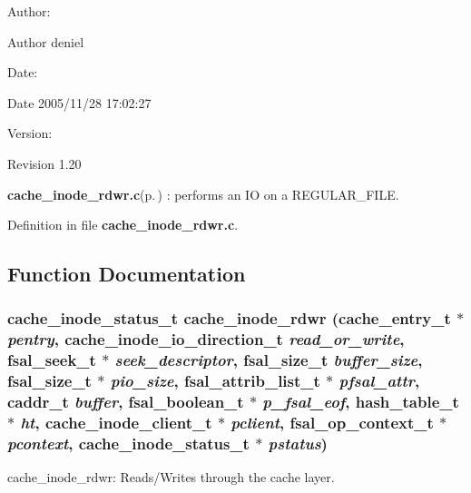 \begin{Desc}
\item[Author:]\begin{Desc}
\item[Author]deniel \end{Desc}
\end{Desc}
\begin{Desc}
\item[Date:]\begin{Desc}
\item[Date]2005/11/28 17:02:27 \end{Desc}
\end{Desc}
\begin{Desc}
\item[Version:]\begin{Desc}
\item[Revision]1.20 \end{Desc}
\end{Desc}
{\bf cache\_\-inode\_\-rdwr.c}{\rm (p.\,\pageref{cache__inode__rdwr_8c})} : performs an IO on a REGULAR\_\-FILE.

Definition in file {\bf cache\_\-inode\_\-rdwr.c}.

\subsection{Function Documentation}
\subsubsection{\setlength{\rightskip}{0pt plus 5cm}cache\_\-inode\_\-status\_\-t cache\_\-inode\_\-rdwr (cache\_\-entry\_\-t $\ast$ {\em pentry}, cache\_\-inode\_\-io\_\-direction\_\-t {\em read\_\-or\_\-write}, fsal\_\-seek\_\-t $\ast$ {\em seek\_\-descriptor}, fsal\_\-size\_\-t {\em buffer\_\-size}, fsal\_\-size\_\-t $\ast$ {\em pio\_\-size}, fsal\_\-attrib\_\-list\_\-t $\ast$ {\em pfsal\_\-attr}, caddr\_\-t {\em buffer}, fsal\_\-boolean\_\-t $\ast$ {\em p\_\-fsal\_\-eof}, hash\_\-table\_\-t $\ast$ {\em ht}, cache\_\-inode\_\-client\_\-t $\ast$ {\em pclient}, fsal\_\-op\_\-context\_\-t $\ast$ {\em pcontext}, cache\_\-inode\_\-status\_\-t $\ast$ {\em pstatus})}\label{cache__inode__rdwr_8c_a0}


cache\_\-inode\_\-rdwr: Reads/Writes through the cache layer.

